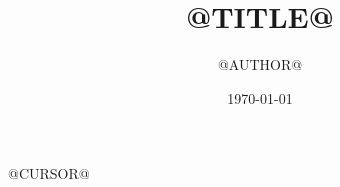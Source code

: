 \documentclass[a4paper, oneside, 10pt]{report}
\author{@AUTHOR@}
\title{@TITLE@}
\date{\today}
\begin{document}
\maketitle
@CURSOR@
\end{document}
